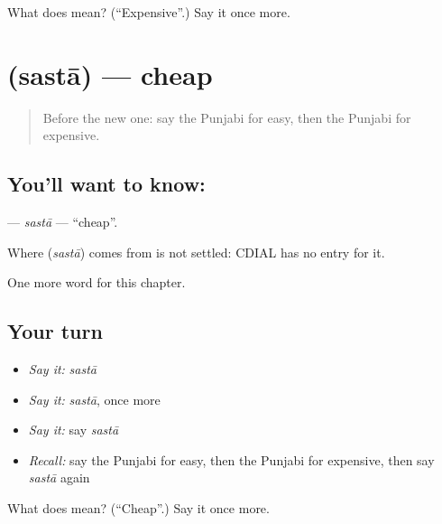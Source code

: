 \begin{tcolorbox}[breakable,colback=teal!4,colframe=teal!35!black,title={Before you move on}]
What does  mean? (\textquotedblleft{}Expensive\textquotedblright{}.) Say it once more.
\end{tcolorbox}
\section[\texorpdfstring{\pa{ਸਸਤਾ} (sastā)}{ਸਸਤਾ (sastā)}]{ (sastā) — cheap}

\label{lesson:PA-C81-sasta}



\begin{quote}
Before the new one: say the Punjabi for easy, then the Punjabi for expensive.
\end{quote}

\subsection*{You'll want to know: }
\textbf{} — \emph{sastā} — \textquotedblleft{}cheap\textquotedblright{}.

\begin{cousinweb}
Where \textbf{} (\emph{sastā}) comes from is not settled: CDIAL has no entry for it.
\end{cousinweb}

\begin{grammarlens}[title={What you've built}]
One more word for this chapter.
\end{grammarlens}

\subsection*{Your turn}
\begin{itemize}
\raggedright
  \item \emph{Say it:} \emph{sastā}
  \item \emph{Say it:} \emph{sastā}, once more
  \item \emph{Say it:} say \emph{sastā}
  \item \emph{Recall:} say the Punjabi for easy, then the Punjabi for expensive, then say \emph{sastā} again
\end{itemize}

\begin{tcolorbox}[breakable,colback=teal!4,colframe=teal!35!black,title={Before you move on}]
What does  mean? (\textquotedblleft{}Cheap\textquotedblright{}.) Say it once more.
\end{tcolorbox}
